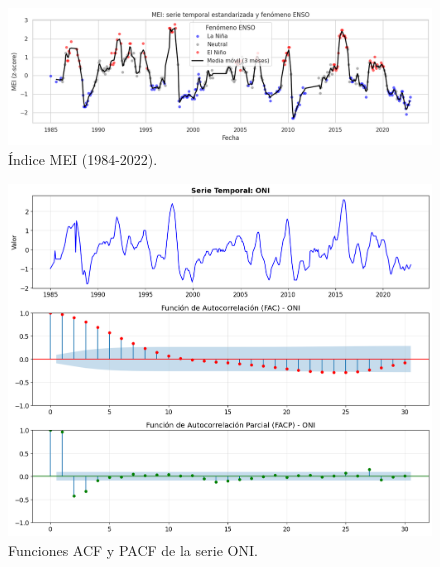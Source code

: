 \begin{figure}[ht]
        \centering
        \includegraphics[scale=.45]
        {Figures/fig19_ts_mei.png}
        \caption{Índice MEI (1984-2022).}
        \label{fig:indice_mei_ts}
\end{figure}
\newpage


\begin{figure}[H]
    \centering
    \includegraphics[scale=.42]{Figures/facp_ONI.png}
    \caption{Funciones ACF y PACF de la serie ONI.}
    \label{fig:facp_oni}
\end{figure}

